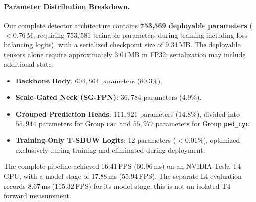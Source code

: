 \paragraph{Parameter Distribution Breakdown.}
Our complete detector architecture contains \textbf{753,569 deployable parameters} ($< 0.76$\,M, requiring $753{,}581$ trainable parameters during training including loss-balancing logits), with a serialized checkpoint size of $9.34$\,MB. The deployable tensors alone require approximately $3.01$\,MB in FP32; serialization may include additional state:
\begin{itemize}
    \item \textbf{Backbone Body}: $604,864$ parameters ($80.3\%$).
    \item \textbf{Scale-Gated Neck (SG-FPN)}: $36,784$ parameters ($4.9\%$).
    \item \textbf{Grouped Prediction Heads}: $111,921$ parameters ($14.8\%$), divided into $55,944$ parameters for Group \texttt{car} and $55,977$ parameters for Group \texttt{ped\_cyc}.
    \item \textbf{Training-Only T-SBUW Logits}: 12 parameters ($< 0.01\%$), optimized exclusively during training and eliminated during deployment.
\end{itemize}
The complete pipeline achieved $16.41$\,FPS ($60.96$\,ms) on an NVIDIA Tesla T4 GPU, with a model stage of $17.88$\,ms ($55.94$\,FPS). The separate L4 evaluation records $8.67$\,ms ($115.32$\,FPS) for its model stage; this is not an isolated T4 forward measurement.

